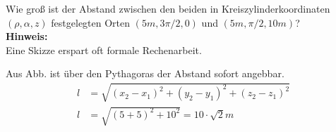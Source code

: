 \begin{question}[section=1,subsection=12,name={Abstand in Kreiszylinderkoordinaten},difficulty=3,type=exercise,tags={}]
	Wie groß  ist der Abstand zwischen den beiden in Kreiszylinderkoordinaten $(\rho, \alpha, z)$ festgelegten Orten $(5 m,3 \pi / 2 , 0)$ und $(5 m, \pi /2, 10 m)$?
	\\ \textbf{Hinweis:}\\
	Eine Skizze erspart oft formale Rechenarbeit.
\end{question}
\begin{solution}
	Aus  Abb. ist \"uber den Pythagoras der Abstand sofort angebbar.
	\begin{align}
		l &= \sqrt{(x_2 - x_1)^2 + (y_2 - y_1)^2 + (z_2 - z_1)^2}\\
		l &= \sqrt{ (5 + 5)^2 + 10 ^2} = 10 \cdot \sqrt{2} m
	\end{align}
\end{solution}
